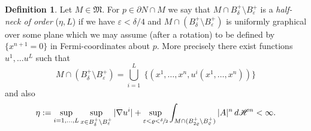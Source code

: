 \documentclass[10pt]{amsart}
\theoremstyle{definition}
\newtheorem{definition}[thm]{Definition}
\newcommand{\h}{\mathscr{H}}
\let\D\nabla
\let\eps\varepsilon
\begin{document}
\begin{definition}\label{neckdef_nonc_boundary}
Let $M\in \mathfrak{M}$. For $p\in \partial N\cap M$ we say that $M\cap B^{+}_\delta\setminus B^{+}_{\eps}$ is a \emph{half-neck of order} ($\eta, L$) if we have $\eps < \delta/4$ and $M\cap (B_\delta^+\setminus B_{\eps}^+)$ is uniformly graphical over some plane which we may assume (after a rotation) to be defined by $\{x^{n+1}=0\}$ in Fermi-coordinates about $p$. More precisely there exist functions $u^1,\dots u^L$ such that
\begin{equation*}
M\cap (B_\delta^+ \setminus B_{\eps}^+) = \bigcup_{i=1}^L \; \{(x^1,\dots , x^n, u^i(x^1,\dots, x^n))\}
\end{equation*}
and also
\begin{equation}
\eta:=\sup_{i=1,\ldots,L}\sup_{x\in B^+_\delta \setminus B^+_{\eps}} |\D u^i|+ \sup_{\eps< \varrho < \sfrac{\delta}{2}} \int_{M \cap (B^+_{2\varrho}\setminus B^+_\varrho)} |A|^n \, d\h^n < \infty.
\end{equation}
\end{definition}
\end{document}
